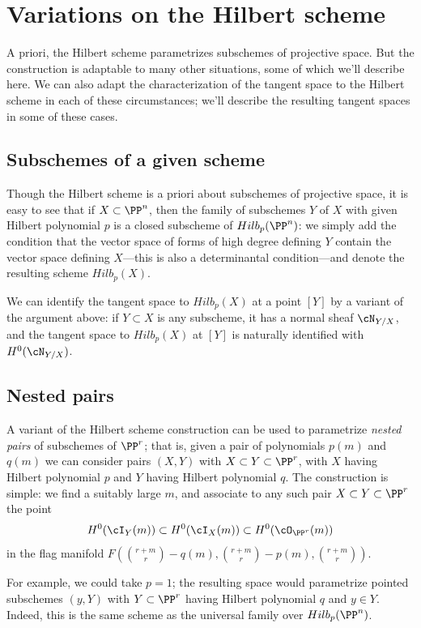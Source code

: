 \section{Variations on the Hilbert scheme}

A priori, the Hilbert scheme parametrizes subschemes of projective space. But the construction is adaptable to many other situations, some of which we'll describe here. We can also adapt the characterization of the tangent space to the Hilbert scheme in each of these circumstances; we'll describe the resulting tangent spaces in some of these cases.


\subsection{Subschemes of a given scheme}

Though the Hilbert scheme is a priori about subschemes of projective space, it is easy to see that if $X\subset \PP^n$,
then the family of subschemes $Y$ of $X$ with given Hilbert polynomial $p$ is a closed subscheme of $Hilb_p(\PP^n)$: we simply
add the condition that the vector space of forms of high degree defining $Y$  contain the vector space defining $X$---this is also a determinantal condition---and denote the resulting scheme $Hilb_p(X)$.

We can identify the tangent space to $Hilb_p(X)$ at a point $[Y]$ by a variant of the argument above: if $Y \subset X$ is any subscheme, it has a normal sheaf $\cN_{Y/X}$, and the tangent space to $Hilb_p(X)$ at $[Y]$ is naturally identified with $H^0(\cN_{Y/X})$.

\subsection{Nested pairs} A variant of the Hilbert scheme construction can be used to parametrize \emph{nested pairs} of subschemes of $\PP^r$; that is, given a pair of polynomials $p(m)$ and $q(m)$ we can consider pairs $(X,Y)$ with $X \subset Y \subset \PP^r$, with $X$ having Hilbert polynomial $p$ and $Y$ having Hilbert polynomial $q$. The construction is simple: we find a suitably large $m$, and associate to any such pair $X \subset Y \subset \PP^r$ the point
$$
H^0(\cI_Y(m)) \subset H^0(\cI_X(m)) \subset H^0(\cO_{\PP^r}(m))
$$
in the flag manifold $F(\binom{r+m}{r} - q(m), \binom{r+m}{r} - p(m), \binom{r+m}{r})$.

For example, we could take $p=1$; the resulting space would parametrize pointed subschemes $(y,Y)$ with $Y \subset \PP^r$ having Hilbert polynomial $q$ and $y \in Y$. Indeed, this is the same scheme as the universal family over $Hilb_p(\PP^n)$.

